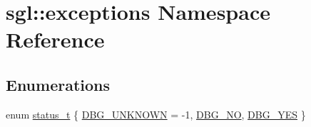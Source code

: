 \hypertarget{namespacesgl_1_1exceptions}{}\section{sgl\+:\+:exceptions Namespace Reference}
\label{namespacesgl_1_1exceptions}
\subsection*{Enumerations}
\begin{DoxyCompactItemize}
\item 
enum \mbox{\hyperlink{namespacesgl_1_1exceptions_af9bff8ff1154a04a899276af806b8586}{status\+\_\+t}} \{ \mbox{\hyperlink{namespacesgl_1_1exceptions_af9bff8ff1154a04a899276af806b8586ae4db7c7ebf0745b6a50dca874c8eb0f7}{D\+B\+G\+\_\+\+U\+N\+K\+N\+O\+WN}} = -\/1, 
\mbox{\hyperlink{namespacesgl_1_1exceptions_af9bff8ff1154a04a899276af806b8586a7a9a6b0033804e09d661906434f757d2}{D\+B\+G\+\_\+\+NO}}, 
\mbox{\hyperlink{namespacesgl_1_1exceptions_af9bff8ff1154a04a899276af806b8586a065f682fca49b754e7b3f6a0d82a963f}{D\+B\+G\+\_\+\+Y\+ES}}
 \}
\end{DoxyCompactItemize}
